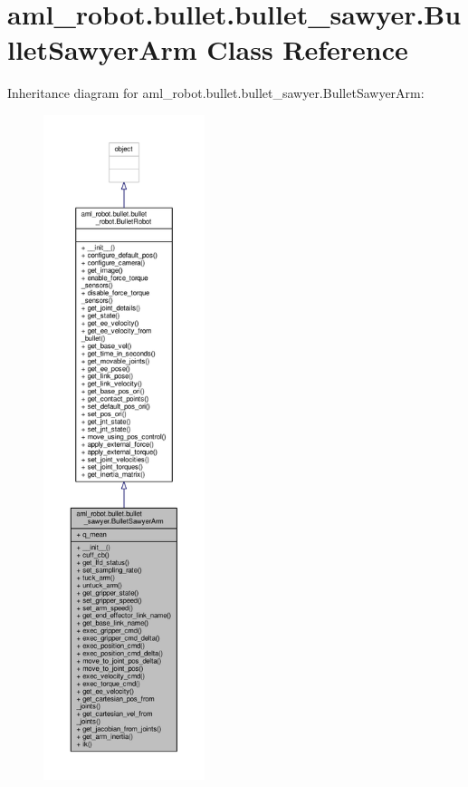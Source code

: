 \hypertarget{classaml__robot_1_1bullet_1_1bullet__sawyer_1_1_bullet_sawyer_arm}{\section{aml\-\_\-robot.\-bullet.\-bullet\-\_\-sawyer.\-Bullet\-Sawyer\-Arm Class Reference}
\label{classaml__robot_1_1bullet_1_1bullet__sawyer_1_1_bullet_sawyer_arm}
}


Inheritance diagram for aml\-\_\-robot.\-bullet.\-bullet\-\_\-sawyer.\-Bullet\-Sawyer\-Arm\-:\nopagebreak
\begin{figure}[H]
\begin{center}
\leavevmode
\includegraphics[height=550pt]{classaml__robot_1_1bullet_1_1bullet__sawyer_1_1_bullet_sawyer_arm__inherit__graph}
\end{center}
\end{figure}



